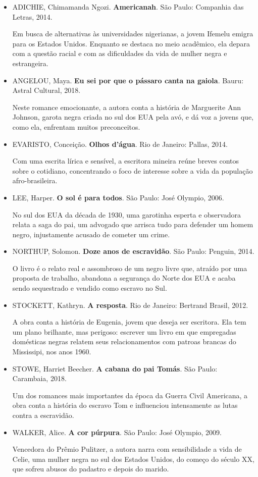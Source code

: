 \documentclass[11pt]{extarticle}
\begin{document}
\begin{itemize}
\item
ADICHIE, Chimamanda Ngozi. \textbf{Americanah}. São Paulo: Companhia
das Letras, 2014.


Em busca de alternativas às universidades nigerianas, a jovem Ifemelu
emigra para os Estados Unidos. Enquanto se destaca no meio acadêmico,
ela depara com a questão racial e com as dificuldades da vida de mulher
negra e estrangeira.

\item
ANGELOU, Maya. \textbf{Eu sei por que o pássaro canta na gaiola}.
Bauru: Astral Cultural, 2018.

Neste romance emocionante, a autora conta a história de Marguerite Ann
Johnson, garota negra criada no sul dos EUA pela avó, e dá voz a jovens
que, como ela, enfrentam muitos preconceitos.

\item
EVARISTO, Conceição. \textbf{Olhos d'água}. Rio de Janeiro: Pallas,
2014.

Com uma escrita lírica e sensível, a escritora mineira reúne breves
contos sobre o cotidiano, concentrando o foco de interesse sobre a vida
da população afro-brasileira.

\item
LEE, Harper. \textbf{O sol é para todos}. São Paulo: José Olympio,
2006.

No sul dos EUA da década de 1930, uma garotinha esperta e observadora
relata a saga do pai, um advogado que arrisca tudo para defender um
homem negro, injustamente acusado de cometer um crime.

\item
NORTHUP, Solomon. \textbf{Doze anos de escravidão}. São Paulo:
Penguin, 2014.

O livro é o relato real e assombroso de um negro livre que, atraído por
uma proposta de trabalho, abandona a segurança do Norte dos EUA e acaba
sendo sequestrado e vendido como escravo no Sul.

\item
STOCKETT, Kathryn. \textbf{A resposta}. Rio de Janeiro: Bertrand
Brasil, 2012.

A obra conta a história de Eugenia, jovem que deseja ser escritora. Ela
tem um plano brilhante, mas perigoso: escrever um livro em que
empregadas domésticas negras relatem seus relacionamentos com patroas
brancas do Mississipi, nos anos 1960.

\item
STOWE, Harriet Beecher. \textbf{A cabana do pai Tomás}. São Paulo:
Carambaia, 2018.

Um dos romances mais importantes da época da Guerra Civil Americana, a
obra conta a história do escravo Tom e influenciou intensamente as lutas
contra a escravidão.

\item
WALKER, Alice. \textbf{A cor púrpura}. São Paulo: José Olympio, 2009.

Vencedora do Prêmio Pulitzer, a autora narra com sensibilidade a vida de
Celie, uma mulher negra no sul dos Estados Unidos, do começo do século
XX, que sofreu abusos do padastro e depois do marido.
\end{itemize}
\end{document}
